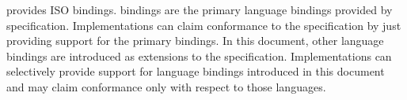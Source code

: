 \openshmem provides ISO \Cstd bindings. \Cstd bindings are the primary language
bindings provided by \openshmem specification. Implementations can claim
conformance to the specification by just providing support for the primary \Cstd
bindings.
In this document, other language bindings are introduced as extensions to the
\openshmem specification. Implementations can selectively provide support for
language bindings introduced in this document and may claim conformance only
with respect to those languages.
